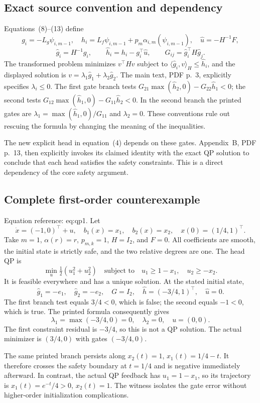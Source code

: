 \documentclass[10pt]{article}
\begin{document}
\subsection*{Exact source convention and dependency}
Equations (8)–(13) define \[g_i=-L_g\psi_{i,m-1},\quad
 h_i=L_f\psi_{i,m-1}+p_m\alpha_{i,m}(\psi_{i,m-1}),\quad
 \widehat u=-H^{-1}F,\] \[\widehat g_i=H^{-1}g_i,\qquad
 \widehat h_i=h_i-g_i^\top\widehat u,\qquad
 G_{ij}=\widehat g_i^\top H\widehat g_j.\] The transformed problem minimizes \(v^\top Hv\) subject to \(\langle\widehat g_i,v\rangle_H\le\widehat h_i\), and the displayed solution is \(v=\lambda_1\widehat g_1+\lambda_2\widehat g_2\). The main text, PDF p. 3, explicitly specifies \(\lambda_i\le0\). The first gate branch tests \(G_{21}\max(\widehat h_2,0)-G_{22}\widehat h_1<0\); the second tests \(G_{12}\max(\widehat h_1,0)-G_{11}\widehat h_2<0\). In the second branch the printed gates are \(\lambda_1=\max(\widehat h_1,0)/G_{11}\) and \(\lambda_2=0\). These conventions rule out rescuing the formula by changing the meaning of the inequalities.\par
The new explicit head in equation (4) depends on these gates. Appendix B, PDF p. 13, then explicitly invokes its claimed identity with the exact QP solution to conclude that each head satisfies the safety constraints. This is a direct dependency of the core safety argument.\par
\subsection*{Complete first-order counterexample}
Equation reference: eq:qp1. Let \[\dot x=(-1,0)^\top+u,\quad
 b_1(x)=x_1,\quad b_2(x)=x_2,\quad
 x(0)=(1/4,1)^\top.\] Take \(m=1\), \(\alpha(r)=r\), \(p_{m,k}=1\), \(H=I_2\), and \(F=0\). All coefficients are smooth, the initial state is strictly safe, and the two relative degrees are one. The head QP is \[
 \min_u \tfrac12(u_1^2+u_2^2)
 \quad\text{subject to}\quad
 u_1\ge1-x_1,\quad u_2\ge-x_2.\] It is feasible everywhere and has a unique solution. At the stated initial state, \[\widehat g_1=-e_1,\quad\widehat g_2=-e_2,\quad
 G=I_2,\quad \widehat h=(-3/4,1)^\top,\quad\widehat u=0.\] The first branch test equals \(3/4<0\), which is false; the second equals \(-1<0\), which is true. The printed formula consequently gives \[\lambda_1=\max(-3/4,0)=0,\quad\lambda_2=0,\quad u=(0,0).\] The first constraint residual is \(-3/4\), so this is not a QP solution. The actual minimizer is \((3/4,0)\) with gates \((-3/4,0)\).\par
The same printed branch persists along \(x_2(t)=1\), \(x_1(t)=1/4-t\). It therefore crosses the safety boundary at \(t=1/4\) and is negative immediately afterward. In contrast, the actual QP feedback has \(u_1=1-x_1\), so its trajectory is \(x_1(t)=e^{-t}/4>0\), \(x_2(t)=1\). The witness isolates the gate error without higher-order initialization complications.\par
\end{document}

